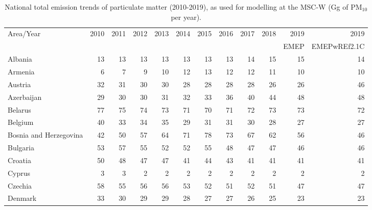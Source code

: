   \begin{table}
 \caption{National total emission trends of particulate matter (2010-2019), as used for modelling at the MSC-W (Gg of PM$_{10}$ per year).}
 
 \vspace{15pt}
 
 \scriptsize
 \centering
 \begin{tabular}{|l|r|r|r|r|r|r|r|r|r|r|r|}
 \hline
                     Area/Year&   2010&   2011&   2012&   2013&   2014&   2015&   2016&   2017&   2018&   2019& 2019 \\
                &&&&&&&&&&{\tiny EMEP}&{\tiny EMEPwREf2.1C}\\\hline\hline
                     Albania&     13&     13&     13&     13&     13&     13&     13&     14&     15&     15&     14\\\hline
                       Armenia&      6&      7&      9&     10&     12&     13&     12&     12&     11&     10&     10\\\hline
                       Austria&     32&     31&     30&     30&     28&     28&     28&     28&     26&     26&     46\\\hline
                    Azerbaijan&     29&     30&     30&     31&     32&     33&     36&     40&     44&     48&     48\\\hline
                       Belarus&     77&     75&     74&     73&     71&     70&     71&     72&     73&     73&     72\\\hline
                       Belgium&     40&     33&     34&     35&     29&     31&     31&     30&     28&     27&     27\\\hline
        Bosnia and Herzegovina&     42&     50&     57&     64&     71&     78&     73&     67&     62&     56&     46\\\hline
                      Bulgaria&     53&     57&     55&     52&     52&     55&     48&     47&     47&     46&     46\\\hline
                       Croatia&     50&     48&     47&     47&     41&     44&     43&     41&     41&     41&     41\\\hline
                        Cyprus&      3&      3&      2&      2&      2&      2&      2&      2&      2&      2&      2\\\hline
                       Czechia&     58&     55&     56&     56&     53&     52&     51&     52&     51&     47&     47\\\hline
                       Denmark&     33&     30&     29&     29&     28&     27&     27&     26&     25&     23&     23\\\hline

\end{tabular}
\end{table}
